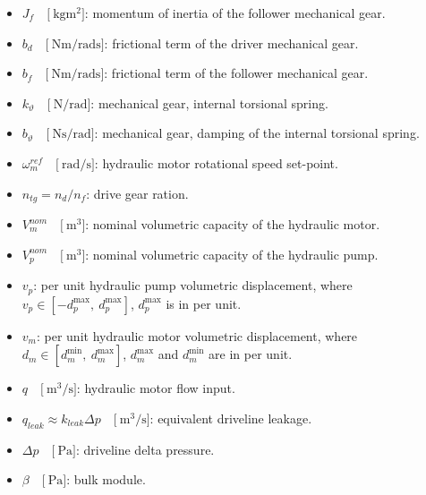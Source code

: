 \documentclass[12pt,a4paper,oneside]{book}
\begin{document}
\begin{onehalfspace}
\begin{itemize}
		\item[--] $J_{f}\quad\Big[\SI{}{\kilogram\square\meter}\Big]$: momentum of inertia of the follower mechanical gear.
		\item[--] $b_{d}\quad\Big[\SI{}{\newton\meter\per\radian\second}\Big]$: frictional term of the driver mechanical gear.
		\item[--] $b_{f}\quad\Big[\SI{}{\newton\meter\per\radian\second}\Big]$: frictional term of the follower mechanical gear.
		\item[--] $k_\vartheta\quad\Big[\SI{}{\newton\per\radian}\Big]$: mechanical gear, internal torsional spring.	
		\item[--] $b_\vartheta\quad\Big[\SI{}{\newton\second\per\radian}\Big]$: mechanical gear, damping of the internal torsional spring.		
		\item[--] $\omega_m^{ref}\quad\Big[\SI{}{\radian\per\second}\Big]$: hydraulic motor rotational speed set-point.
		\item[--] $n_{tg}=n_{d}/n_{f}$: drive gear ration.
		\item[--] $V_m^{nom}\quad\Big[\SI{}{\cubic\meter}\Big]$: nominal volumetric capacity of the hydraulic motor.
		\item[--] $V_p^{nom}\quad\Big[\SI{}{\cubic\meter}\Big]$: nominal volumetric capacity of the hydraulic pump.
		\item[--] $v_p$: per unit hydraulic pump volumetric displacement, where $v_p   \in [-d_p^\text{max},\ d_p^\text{max}]$, $d_p^\text{max}$ is in per unit.
		\item[--] $v_m$: per unit hydraulic motor volumetric displacement, where $d_m\in [d_m^\text{min},\ d_m^\text{max}]$, $d_m^\text{max}$ and $d_m^\text{min}$ are in per unit.
		\item[--] $q\quad\Big[\SI{}{\cubic\meter\per\second}\Big]$: hydraulic motor flow input.		
		\item[--] $q_{leak} \approx k_{leak}\Delta p \quad\Big[\SI{}{\cubic\meter\per\second}\Big]$: equivalent driveline leakage.
		\item[--] $\Delta p\quad\Big[\SI{}{\pascal}\Big] $: driveline delta pressure.
		\item[--] $\beta\quad\Big[\SI{}{\pascal}\Big] $: bulk module.
	\end{itemize}


\end{onehalfspace}
\end{document}

